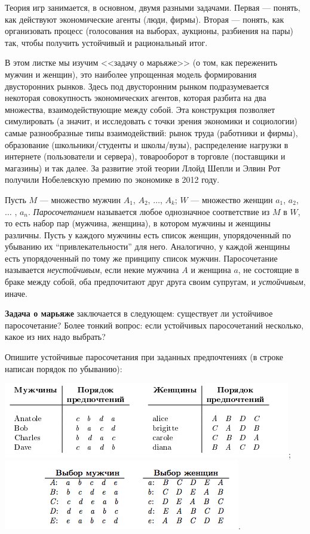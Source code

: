 \documentclass[a4paper,11pt]{article}
\begin{document}



{\footnotesize
Теория игр занимается, в основном, двумя разными задачами. Первая --- понять, как действуют экономические агенты (люди, фирмы). Вторая --- понять, как организовать процесс (голосования на выборах, аукционы, разбиения на пары) так, чтобы получить устойчивый и рациональный итог.

В этом листке мы изучим <<задачу о марьяже>> (о том, как переженить мужчин и женщин), это наиболее упрощенная модель формирования двусторонних рынков. Здесь под двусторонним рынком подразумевается некоторая совокупность экономических агентов, которая разбита на два множества, взаимодействующие между собой. Эта конструкция позволяет симулировать (а значит, и исследовать с точки зрения экономики и социологии) самые разнообразные типы взаимодействий: рынок труда (работники и фирмы), образование (школьники/студенты и школы/вузы), распределение нагрузки в интернете (пользователи и сервера), товарооборот в торговле (поставщики и магазины) и так далее. За развитие этой теории Ллойд Шепли и Элвин Рот получили Нобелевскую премию по экономике в 2012 году.

}


Пусть $M$ --- множество мужчин $A_1$, $A_2$,  $\ldots$, $A_k$; $W$ --- множество женщин $a_1$, $a_2$, $\ldots$ , $a_n$.
\textit{Паросочетанием} называется любое однозначное соответствие из $M$ в $W$, то есть набор пар (мужчина, женщина), в котором мужчины и женщины различны. Пусть у каждого мужчины есть список женщин, упорядоченный по убыванию их “привлекательности” для него. Аналогично, у
каждой женщины есть упорядоченный по тому же принципу список мужчин. Паросочетание называется \textit{неустойчивым}, если некие мужчина $A$ и женщина $a$, не состоящие в браке между собой, оба предпочитают друг друга своим супругам, и \textit{устойчивым}, иначе.

{\bf Задача о марьяже} заключается в следующем: существует ли устойчивое паросочетание? Более тонкий вопрос: если устойчивых паросочетаний несколько, какое из них надо выбрать?

\label{examp} Опишите устойчивые паросочетания при заданных предпочтениях (в строке написан порядок по убыванию):

 \includegraphics[scale=0.5]{pict1.png};
 \includegraphics[scale=0.5]{pict2.png}.
\end{document}
